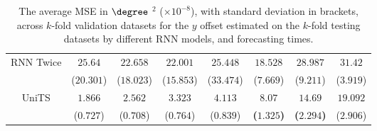 \begin{table}[!ht]
{\begin{tabular}{|c|c|c|c|c|c|c|c|}
			\multirow{2}{*}{RNN Twice} & $25.64$ & $22.658$ & $22.001$ & $25.448$ & $18.528$ & $28.987$ & $31.42$ \\
			 & ($20.301$) & ($18.023$) & ($15.853$) & ($33.474$) & ($7.669$) & ($9.211$) & ($3.919$) \\ \hline
			\multirow{2}{*}{UniTS} & $1.866$ & $2.562$ & $3.323$ & $4.113$ & $\mathbf{8.07}$ & $\mathbf{14.69}$ & $19.092$ \\
			 & ($0.727$) & ($0.708$) & ($0.764$) & ($0.839$) & \textbf{(}$\mathbf{1.325}$\textbf{)} & \textbf{(}$\mathbf{2.294}$\textbf{)} & ($2.906$) \\ \hline
		\end{tabular}
	}
	\caption{The average MSE in $\degree$ $^{2}$ ($\times 10^{-8}$), with standard deviation in brackets, across $k$-fold validation datasets for the $y$ offset estimated on the $k$-fold testing datasets by different RNN models, and forecasting times.}
	\label{tab:all_latitude_no_abs_MSE}
\end{table}